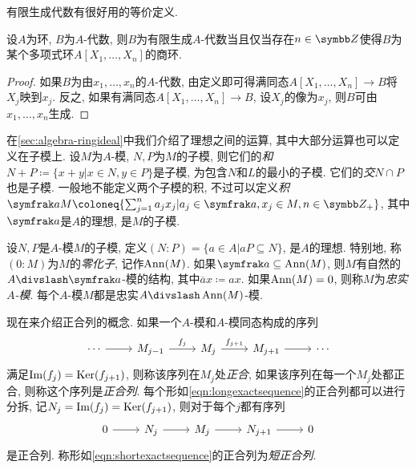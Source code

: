 有限生成代数有很好用的等价定义.

\begin{proposition}\label{prop:fgalgebra}
  设$A$为环, $B$为$A$-代数, 则$B$为有限生成$A$-代数当且仅当存在$n\in \ZZ$使得$B$为某个多项式环$A[X_1, \dotsc, X_n]$的商环.
\end{proposition}

\begin{proof}
  如果$B$为由$x_1, \dotsc, x_n$的$A$-代数, 由定义即可得满同态$A[X_1, \dotsc, X_n]\to B$将$X_j$映到$x_j$. 反之, 如果有满同态$A[X_1, \dotsc, X_n]\to B$, 设$X_j$的像为$x_j$, 则$B$可由$x_1, \dotsc, x_n$生成.
\end{proof}

在\ref{sec:algebra-ringideal}中我们介绍了理想之间的运算, 其中大部分运算也可以定义在子模上. 设$M$为$A$-模, $N, P$为$M$的子模, 则它们的\emph{和}$N+P\coloneq \{x+y\vert x\in N, y\in P\}$是子模, 为包含$N$和$L$的最小的子模. 它们的\emph{交}$N\cap P$也是子模. 一般地不能定义两个子模的积, 不过可以定义\emph{积}$\ideal{a}M\coloneq \{\sum_{j=1}^n a_jx_j\vert a_j\in\ideal{a}, x_j\in M, n\in\ZZ_+\}$, 其中$\ideal{a}$是$A$的理想, 是$M$的子模.

设$N, P$是$A$-模$M$的子模, 定义$(N{:}P)=\{a\in A\vert aP\subseteq N\}$, 是$A$的理想. 特别地, 称$(0{:}M)$为$M$的\emph{零化子}, 记作$\operatorname{Ann} (M)$. 如果$\ideal{a}\subseteq \Ann (M)$, 则$M$有自然的$A{\divslash}\ideal{a}$-模的结构, 其中$\overline{a}x\coloneq ax$. 如果$\operatorname{Ann} (M)=0$, 则称$M$为\emph{忠实$A$-模}. 每个$A$-模$M$都是忠实$A{\divslash}\Ann (M)$-模.

\begin{definition}
  现在来介绍正合列的概念. 如果一个$A$-模和$A$-模同态构成的序列
  \begin{equation}
    \begin{tikzcd}
      \dotsb \arrow[r] & M_{j-1} \arrow[r, "f_j"] & M_j \arrow[r, "f_{j+1}"] & M_{j+1} \arrow[r] & \dotsb\label{eqn:longexactsequence}
    \end{tikzcd}
  \end{equation}
  满足$\operatorname{Im} (f_j)=\operatorname{Ker} (f_{j+1})$, 则称该序列在$M_j$处\emph{正合}, 如果该序列在每一个$M_j$处都正合, 则称这个序列是\emph{正合列}. 每个形如\eqref{eqn:longexactsequence}的正合列都可以进行分拆, 记$N_j=\operatorname{Im} (f_j)=\operatorname{Ker} (f_{j+1})$, 则对于每个$j$都有序列
  \begin{equation}
    \begin{tikzcd}
      0 \arrow[r] & N_j \arrow[r] & M_j \arrow[r] & N_{j+1} \arrow[r] & 0\label{eqn:shortexactsequence}
    \end{tikzcd}
  \end{equation}
  是正合列. 称形如\eqref{eqn:shortexactsequence}的正合列为\emph{短正合列}.
\end{definition}

